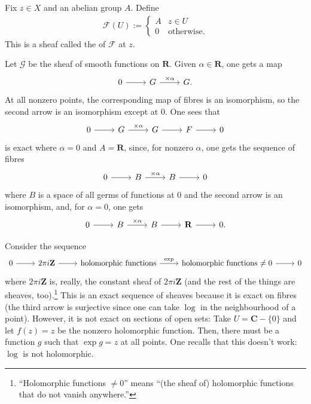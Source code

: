 \documentclass [11 pt, oneside] {article}
\begin{document}
\begin{example}\label{}\text{}
Fix $z \in X$ and an abelian group $A$. Define
\begin{align*}
	\mathscr{F}(U) := 
	 \begin{cases}
		 A & z\in U\\
		 0&\textrm{otherwise.}
	\end{cases}
\end{align*}
This is a sheaf called the  of $\mathscr{F}$ at $z$. 

Let $\mathscr{G}$ be the sheaf of smooth functions on $\mathbf{R}$. Given $\alpha\in \mathbf{R}$, one gets a map 
\[
\begin{tikzcd}
	0\ar[r] & \mathscr{G}\ar[r, "\times \alpha"] &\mathscr{G}.
\end{tikzcd}
\]
At all nonzero points, the corresponding map of fibres is an isomorphism, so the second arrow is an isomorphism except at $0$. One sees that
\[
\begin{tikzcd}
	0\ar[r] &\mathscr{G}\ar[r,"\times \alpha"] &\mathscr{G}\ar[r] &\mathscr{F}\ar[r] &0
\end{tikzcd}
\]
is exact where $\alpha = 0$ and $A=\mathbf{R}$, since, for nonzero $\alpha$, one gets the sequence of fibres
\[
\begin{tikzcd}
	0 \ar[r] & B\ar[r, "\times \alpha"] & B\ar[r] &0
\end{tikzcd}
\]
where $B$ is a space of all germs of functions at $0$ and the second arrow is an isomorphism, and, for $\alpha = 0$, one gets
\[
\begin{tikzcd}
	0\ar[r] & B\ar[r,"\times\alpha"] & B\ar[r] & \mathbf{R}\ar[r] & 0.
\end{tikzcd}
\]
\end{example}

\begin{example}[ ]\label{}\text{}
Consider the sequence
\[
\begin{tikzcd}
	0 \ar[r] & 2\pi i \mathbf{Z} \ar[r] & \textrm{holomorphic functions} \ar[r, "\exp"] &\textrm{holomorphic functions $\ne 0$} \ar[r] & 0
\end{tikzcd}
\]
where $2\pi i \mathbf{Z}$ is, really, the constant sheaf of $2\pi i \mathbf{Z}$ (and the rest of the things are sheaves, too).\footnote{``Holomorphic functions $\ne 0$'' means ``(the sheaf of) holomorphic functions that do not vanish anywhere.''} This is an exact sequence of sheaves because it is exact on fibres (the third arrow is surjective since one can take $\log$ in the neighbourhood of a point). However, it is not exact on sections of open sets: Take $U = \mathbf{C}-\{0\}$ and let $f(z)=z$ be the nonzero holomorphic function. Then, there must be a function $g$ such that $\exp g = z$ at all points. One recalls that this doesn't work: $\log$ is not holomorphic.
\end{example}
\end{document}

